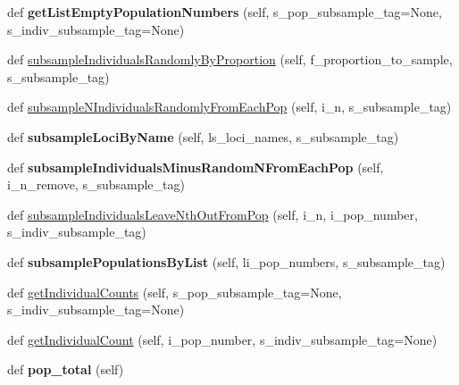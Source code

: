 \begin{DoxyCompactItemize}
\item 
def {\bfseries get\+List\+Empty\+Population\+Numbers} (self, s\+\_\+pop\+\_\+subsample\+\_\+tag=None, s\+\_\+indiv\+\_\+subsample\+\_\+tag=None)\hypertarget{classnegui_1_1genepopfilemanager_1_1GenepopFileManager_a05c943d32cf60349e9430ab9bd53e7d2}{}\label{classnegui_1_1genepopfilemanager_1_1GenepopFileManager_a05c943d32cf60349e9430ab9bd53e7d2}

\item 
def \hyperlink{classnegui_1_1genepopfilemanager_1_1GenepopFileManager_a5c85ac4838fd6919be1c408bcd39f54e}{subsample\+Individuals\+Randomly\+By\+Proportion} (self, f\+\_\+proportion\+\_\+to\+\_\+sample, s\+\_\+subsample\+\_\+tag)
\item 
def \hyperlink{classnegui_1_1genepopfilemanager_1_1GenepopFileManager_affaeb9457d84736dc1f289d600808f56}{subsample\+N\+Individuals\+Randomly\+From\+Each\+Pop} (self, i\+\_\+n, s\+\_\+subsample\+\_\+tag)
\item 
def {\bfseries subsample\+Loci\+By\+Name} (self, ls\+\_\+loci\+\_\+names, s\+\_\+subsample\+\_\+tag)\hypertarget{classnegui_1_1genepopfilemanager_1_1GenepopFileManager_afa08aba8e7a78951a6c0583aac52c9af}{}\label{classnegui_1_1genepopfilemanager_1_1GenepopFileManager_afa08aba8e7a78951a6c0583aac52c9af}

\item 
def {\bfseries subsample\+Individuals\+Minus\+Random\+N\+From\+Each\+Pop} (self, i\+\_\+n\+\_\+remove, s\+\_\+subsample\+\_\+tag)\hypertarget{classnegui_1_1genepopfilemanager_1_1GenepopFileManager_a97b12689980e0d6ce31c5882af1fd4e3}{}\label{classnegui_1_1genepopfilemanager_1_1GenepopFileManager_a97b12689980e0d6ce31c5882af1fd4e3}

\item 
def \hyperlink{classnegui_1_1genepopfilemanager_1_1GenepopFileManager_afb85a943b15c9a259510cc7f61b085b3}{subsample\+Individuals\+Leave\+Nth\+Out\+From\+Pop} (self, i\+\_\+n, i\+\_\+pop\+\_\+number, s\+\_\+indiv\+\_\+subsample\+\_\+tag)
\item 
def {\bfseries subsample\+Populations\+By\+List} (self, li\+\_\+pop\+\_\+numbers, s\+\_\+subsample\+\_\+tag)\hypertarget{classnegui_1_1genepopfilemanager_1_1GenepopFileManager_aab1109500d95ec010b4c39f198bb41c9}{}\label{classnegui_1_1genepopfilemanager_1_1GenepopFileManager_aab1109500d95ec010b4c39f198bb41c9}

\item 
def \hyperlink{classnegui_1_1genepopfilemanager_1_1GenepopFileManager_aca743749002b9828cd66730e42db4387}{get\+Individual\+Counts} (self, s\+\_\+pop\+\_\+subsample\+\_\+tag=None, s\+\_\+indiv\+\_\+subsample\+\_\+tag=None)
\item 
def \hyperlink{classnegui_1_1genepopfilemanager_1_1GenepopFileManager_a05e723069f5129b21a4d017c2a5317b0}{get\+Individual\+Count} (self, i\+\_\+pop\+\_\+number, s\+\_\+indiv\+\_\+subsample\+\_\+tag=None)
\item 
def {\bfseries pop\+\_\+total} (self)\hypertarget{classnegui_1_1genepopfilemanager_1_1GenepopFileManager_afeefa4552274231bedce1fc6b8c0532d}{}\label{classnegui_1_1genepopfilemanager_1_1GenepopFileManager_afeefa4552274231bedce1fc6b8c0532d}


\end{DoxyCompactItemize}
